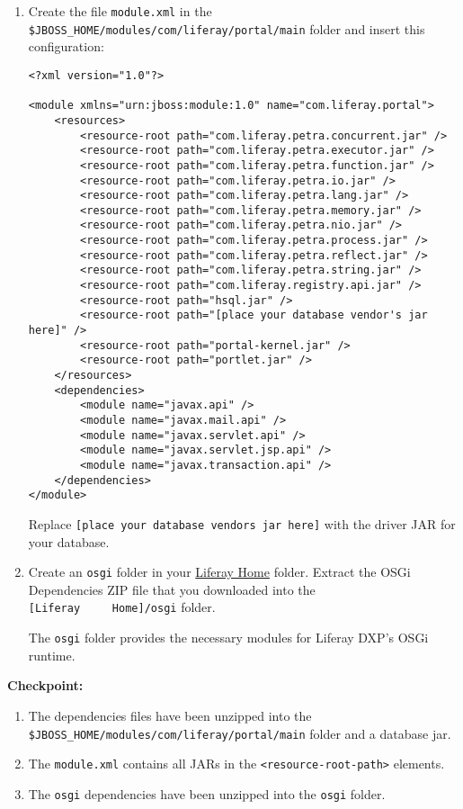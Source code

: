 \begin{enumerate}
\def\labelenumi{\arabic{enumi}.}
\setcounter{enumi}{2}
\item
  Create the file \texttt{module.xml} in the
  \texttt{\$JBOSS\_HOME/modules/com/liferay/portal/main} folder and
  insert this configuration:

\begin{verbatim}
<?xml version="1.0"?>

<module xmlns="urn:jboss:module:1.0" name="com.liferay.portal">
    <resources>
        <resource-root path="com.liferay.petra.concurrent.jar" />
        <resource-root path="com.liferay.petra.executor.jar" />
        <resource-root path="com.liferay.petra.function.jar" />
        <resource-root path="com.liferay.petra.io.jar" />
        <resource-root path="com.liferay.petra.lang.jar" />
        <resource-root path="com.liferay.petra.memory.jar" />
        <resource-root path="com.liferay.petra.nio.jar" />
        <resource-root path="com.liferay.petra.process.jar" />
        <resource-root path="com.liferay.petra.reflect.jar" />
        <resource-root path="com.liferay.petra.string.jar" />
        <resource-root path="com.liferay.registry.api.jar" />
        <resource-root path="hsql.jar" />
        <resource-root path="[place your database vendor's jar here]" />
        <resource-root path="portal-kernel.jar" />
        <resource-root path="portlet.jar" />
    </resources>
    <dependencies>
        <module name="javax.api" />
        <module name="javax.mail.api" />
        <module name="javax.servlet.api" />
        <module name="javax.servlet.jsp.api" />
        <module name="javax.transaction.api" />
    </dependencies>
</module>
\end{verbatim}

  Replace
  \texttt{{[}place\ your\ database\ vendor\textquotesingle{}s\ jar\ here{]}}
  with the driver JAR for your database.
\item
  Create an \texttt{osgi} folder in your
  \href{/docs/7-2/deploy/-/knowledge_base/d/liferay-home}{Liferay Home}
  folder. Extract the OSGi Dependencies ZIP file that you downloaded
  into the \texttt{{[}Liferay\ \ \ \ \ Home{]}/osgi} folder.

  The \texttt{osgi} folder provides the necessary modules for Liferay
  DXP's OSGi runtime.
\end{enumerate}

\textbf{Checkpoint:}

\begin{enumerate}
\def\labelenumi{\arabic{enumi}.}
\tightlist
\item
  The dependencies files have been unzipped into the
  \texttt{\$JBOSS\_HOME/modules/com/liferay/portal/main} folder and a
  database jar.
\item
  The \texttt{module.xml} contains all JARs in the
  \texttt{\textless{}resource-root-path\textgreater{}} elements.
\item
  The \texttt{osgi} dependencies have been unzipped into the
  \texttt{osgi} folder.
\end{enumerate}

